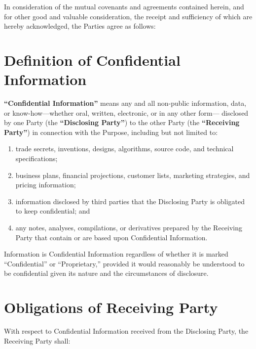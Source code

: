 \documentclass[11pt, a4paper]{article}
\newcommand{\term}[1]{\textbf{``#1''}}
\begin{document}
\vspace{4pt}
\noindent
In consideration of the mutual covenants and agreements contained herein, and for
other good and valuable consideration, the receipt and sufficiency of which are
hereby acknowledged, the Parties agree as follows:

\vspace{4pt}


\section{Definition of Confidential Information}

\noindent
\term{Confidential Information} means any and all non-public information,
data, or know-how—whether oral, written, electronic, or in any other form—
disclosed by one Party (the \term{Disclosing Party}) to the other Party
(the \term{Receiving Party}) in connection with the Purpose, including but
not limited to:

\begin{enumerate}
  \item trade secrets, inventions, designs, algorithms, source code, and
        technical specifications;
  \item business plans, financial projections, customer lists, marketing
        strategies, and pricing information;
  \item information disclosed by third parties that the Disclosing Party
        is obligated to keep confidential; and
  \item any notes, analyses, compilations, or derivatives prepared by the
        Receiving Party that contain or are based upon Confidential Information.
\end{enumerate}

\noindent
Information is Confidential Information regardless of whether it is marked
``Confidential'' or ``Proprietary,'' provided it would reasonably be
understood to be confidential given its nature and the circumstances of
disclosure.

\section{Obligations of Receiving Party}

\noindent
With respect to Confidential Information received from the Disclosing Party,
the Receiving Party shall:
\end{document}
